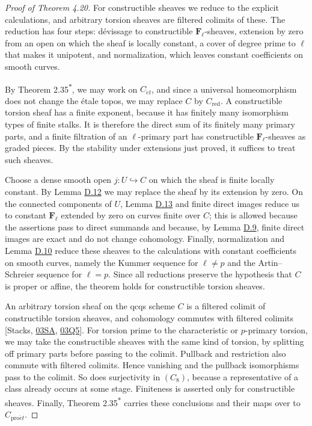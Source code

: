 \documentclass[11pt]{article}
\newcommand{\bpout}[1]{#1\textsuperscript{\hyperlink{bp-outside}{\ensuremath{\ast}}}}
\begin{document}
\begin{proof}[{Proof of Theorem 4.20}]\label{bp51}%
For constructible sheaves we reduce to the explicit calculations, and arbitrary torsion sheaves are filtered colimits of these. The reduction has four steps: dévissage to constructible \(\mathbf F_\ell\)-sheaves, extension by zero from an open on which the sheaf is locally constant, a cover of degree prime to \(\ell\) that makes it unipotent, and normalization, which leaves constant coefficients on smooth curves.

By Theorem \bpout{2.35}, we may work on \(C_{\acute{e}t}\), and since a universal homeomorphism does not change the étale topos, we may replace \(C\) by \(C_{\mathrm{red}}\).  A constructible torsion sheaf has a finite exponent, because it has finitely many isomorphism types of finite stalks.  It is therefore the direct sum of its finitely many primary parts, and a finite filtration of an \(\ell\)-primary part has constructible \(\mathbf F_\ell\)-sheaves as graded pieces.  By the stability under extensions just proved, it suffices to treat such sheaves.

Choose a dense smooth open \(j:U\hookrightarrow C\) on which the sheaf is finite locally constant.  By Lemma \hyperref[bp41]{D.12} we may replace the sheaf by its extension by zero.  On the connected components of \(U\), Lemma \hyperref[bp46]{D.13} and finite direct images reduce us to constant \(\mathbf F_\ell\) extended by zero on curves finite over \(C\); this is allowed because the assertions pass to direct summands and because, by Lemma \hyperref[bp30]{D.9}, finite direct images are exact and do not change cohomology.  Finally, normalization and Lemma \hyperref[bp33]{D.10} reduce these sheaves to the calculations with constant coefficients on smooth curves, namely the Kummer sequence for \(\ell\ne p\) and the Artin–Schreier sequence for \(\ell=p\).  Since all reductions preserve the hypothesis that \(C\) is proper or affine, the theorem holds for constructible torsion sheaves.

An arbitrary torsion sheaf on the qcqs scheme \(C\) is a filtered colimit of constructible torsion sheaves, and cohomology commutes with filtered colimits [Stacks, \href{https://stacks.math.columbia.edu/tag/03SA}{03SA}, \href{https://stacks.math.columbia.edu/tag/03Q5}{03Q5}].  For torsion prime to the characteristic or \(p\)-primary torsion, we may take the constructible sheaves with the same kind of torsion, by splitting off primary parts before passing to the colimit. Pullback and restriction also commute with filtered colimits. Hence vanishing and the pullback isomorphisms pass to the colimit. So does surjectivity in \((C_8)\), because a representative of a class already occurs at some stage. Finiteness is asserted only for constructible sheaves. Finally, Theorem \bpout{2.35} carries these conclusions and their maps over to \(C_{\mathrm{pro}\acute{e}t}\).
\end{proof}
\end{document}
